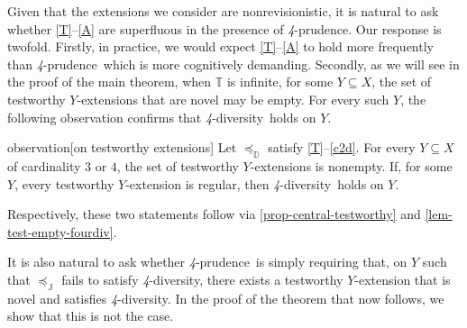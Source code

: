 \documentclass[12pt,a4paper,twoside]{article}
\newcommand{\mbbd}{{\mathds D}}
\newcommand{\mbbt}{{\mathds {T}}}
\newcommand{\mbbj}{\mathds J}
\newcommand{\fourpru}{\textit{4}-\textup{prudence}}
\newcommand{\fourdiv}{\textit{4}-\textup{diversity}}
\begin{document}
Given that the extensions we consider are nonrevisionistic, it is natural to ask
whether \ref{T}--\ref{A} are superfluous in the presence of \fourpru. Our response
is twofold. Firstly, in practice, we would expect \ref{T}--\ref{A} to hold more
frequently than \fourpru\ which is more cognitively demanding. Secondly, as we
will see in the proof of the main theorem, when $ \mbbt $ is infinite, for some
$ Y \subseteq X $, the set of testworthy $ Y $-extensions that are novel may be
empty. For every such $Y$, the following observation confirms that \fourdiv\
holds on $Y$.
\begin{theoremEnd}{observation}[on testworthy
  extensions]\label{obs-testworthy}
  Let $\preceq_{\mbbd}$ satisfy \ref{T}–\ref{c2d}. For every $Y\subseteq X$ of
  cardinality $ 3$ or $ 4$, the set of testworthy $Y$-extensions is
  nonempty. If, for some $Y$, every testworthy $Y$-extension is regular, then
  \fourdiv\ holds on $Y$.
\end{theoremEnd}
\begin{proofEnd}\label{proof-obs-c2d}
  Respectively, these two statements follow via \cref{prop-central-testworthy}
  and \cref{lem-test-empty-fourdiv}.
\end{proofEnd}
It is also natural to  ask whether \fourpru\ is simply requiring that, on $Y$ such that
$\preceq_{\mbbj}$ fails to satisfy \fourdiv, there exists a testworthy
$Y$-extension that is novel and  satisfies \fourdiv. In the proof of the
theorem that now follows, we show that this is not the case.
\end{document}
